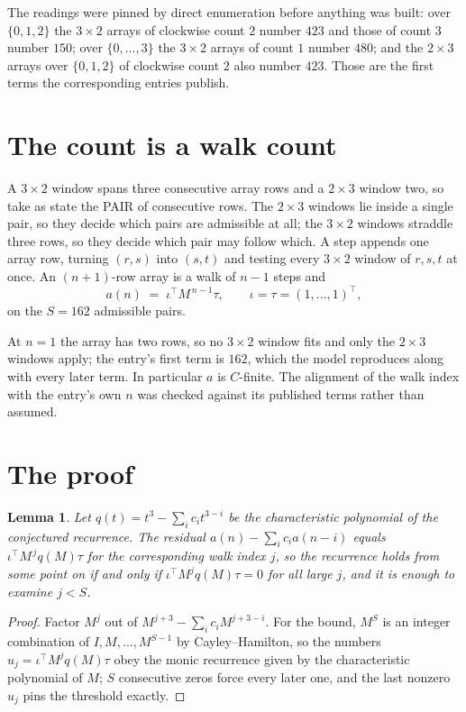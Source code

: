 \documentclass[11pt,a4paper]{article}
\theoremstyle{plain}
\newtheorem{lemma}[theorem]{Lemma}
\theoremstyle{definition}
\begin{document}
The readings were pinned by direct enumeration before anything was built: over
$\{0,1,2\}$ the $3\times2$ arrays of clockwise count $2$ number $423$ and those of count
$3$ number $150$; over $\{0,\dots,3\}$ the $3\times2$ arrays of count $1$ number $480$;
and the $2\times3$ arrays over $\{0,1,2\}$ of clockwise count $2$ also number $423$. Those
are the first terms the corresponding entries publish.

\section{The count is a walk count}

A $3\times2$ window spans three consecutive array rows and a $2\times3$
window two, so take as state the PAIR of consecutive rows. The $2\times3$ windows lie inside a
single pair, so they decide which pairs are admissible at all; the $3\times2$ windows straddle
three rows, so they decide which pair may follow which. A step appends one array row, turning
$(r,s)$ into $(s,t)$ and testing every $3\times2$ window of $r,s,t$ at once. An $(n+1)$-row
array is a walk of $n-1$ steps and
\[
a(n)\;=\;\iota^{\!\top}M^{\,n-1}\tau,\qquad\iota=\tau=(1,\dots,1)^{\!\top},
\]
on the $S=162$ admissible pairs.

At $n=1$ the array has two rows, so no $3\times2$ window fits and only the
$2\times3$ windows apply; the entry's first term is
$162$, which the model reproduces along with every later term.
In particular $a$ is $C$-finite. The alignment of the walk index with the entry's own $n$ was
checked against its published terms rather than assumed.

\section{The proof}

\begin{lemma}\label{lem:crit}
Let $q(t)=t^{3}-\sum_i c_it^{3-i}$ be the characteristic polynomial of the
conjectured recurrence. The residual $a(n)-\sum_ic_ia(n-i)$ equals
$\iota^{\!\top}M^{\,j}q(M)\tau$ for the corresponding walk index $j$, so the recurrence
holds from some point on if and only if $\iota^{\!\top}M^{j}q(M)\tau=0$ for all large $j$,
and it is enough to examine $j<S$.
\end{lemma}

\begin{proof}
Factor $M^{j}$ out of $M^{j+3}-\sum_ic_iM^{j+3-i}$. For the bound, $M^{S}$
is an integer combination of $I,M,\dots,M^{S-1}$ by Cayley--Hamilton, so the numbers
$u_j=\iota^{\!\top}M^{j}q(M)\tau$ obey the monic recurrence given by the characteristic
polynomial of $M$; $S$ consecutive zeros force every later one, and the last nonzero $u_j$
pins the threshold exactly.
\end{proof}
\end{document}
